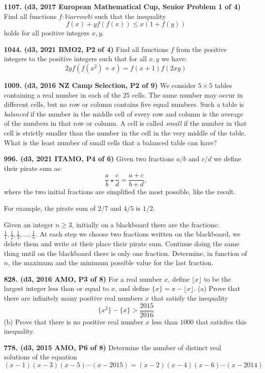 \documentclass{article}
\begin{document}
\textbf{1107. (\color{red}d3\color{black}, 2017 European Mathematical Cup, Senior Problem 1 of 4)} Find all functions $f: \mathbb{N} arrow \mathbb{N}$ such that the inequality
$$
    f(x)+y f(f(x)) \leq x(1+f(y))
$$
holds for all positive integers $x, y$.

\textbf{1044. (\color{red}d3\color{black}, 2021 BMO2, P2 of 4)} Find all functions $f$ from the positive integers to the positive integers such that for all $x, y$ we have:
$$
    2 y f(f(x^{2})+x)=f(x+1) f(2 x y)
$$

\textbf{1009. (\color{red}d3\color{black}, 2016 NZ Camp Selection, P2 of 9)} We consider \(5 \times 5\) tables containing a real number in each of the 25 cells. The same number may occur in different cells, but no row or column contains five equal numbers. Such a table is \emph{balanced} if the number in the middle cell of every row and column is the average of the numbers in that row or column. A cell is called \emph{small} if the number in that cell is strictly smaller than the number in the cell in the very middle of the table. What is the least number of small cells that a balanced table can have?

\textbf{996. (\color{red}d3\color{black}, 2021 ITAMO, P4 of 6)} Given two fractions $a / b$ and $c / d$ we define their pirate sum as:
$$\frac{a}{b} \star \frac{c}{d}=\frac{a+c}{b+d},$$
where the two initial fractions are simplified the most possible, like the result.

For example, the pirate sum of $2 / 7$ and $4 / 5$ is $1 / 2$.

Given an integer $n \geq 3$, initially on a blackboard there are the fractions:
$\frac{1}{1}, \frac{1}{2}, \frac{1}{3}, \ldots, \frac{1}{n}$.
At each step we choose two fractions written on the blackboard, we delete them and write at their place their pirate sum.
Continue doing the same thing until on the blackboard there is only one fraction.
Determine, in function of $n$, the maximum and the minimum possible value for the last fraction.

\textbf{828. (\color{red}d3\color{black}, 2016 AMO, P3 of 8)} For a real number $x$, define $\lfloor x\rfloor$ to be the largest integer less than or equal to $x$, and define $\{x\}=x-\lfloor x\rfloor$.
\smallbreak
(a) Prove that there are infinitely many positive real numbers $x$ that satisfy the inequality
$$ \{x^{2}\}-\{x\}>\frac{2015}{2016} $$
(b) Prove that there is no positive real number $x$ less than $1000$ that satisfies this inequality.

\textbf{778. (\color{red}d3\color{black}, 2015 AMO, P6 of 8)} Determine the number of distinct real solutions of the equation $$(x-1)(x-3)(x-5) \cdots(x-2015)=(x-2)(x-4)(x-6) \cdots(x-2014)$$
\end{document}
